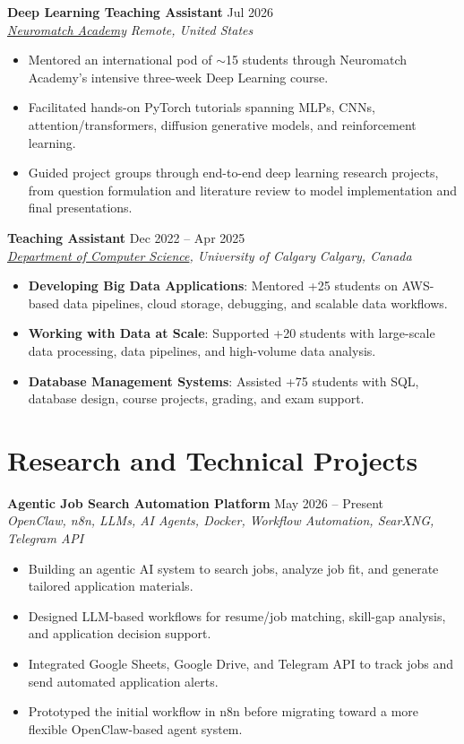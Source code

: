 \documentclass[a4paper,10pt]{article}
\newcommand{\resumeSubheading}[4]{
    \textbf{#1} \hfill #2 \\
    \textit{#3} \hfill \textit{#4}
}
\begin{document}
\resumeSubheading
{Deep Learning Teaching Assistant}
{Jul 2026}
{\href{https://neuromatch.io/}{Neuromatch Academy}}
{Remote, United States}
\begin{itemize}[leftmargin=0.25in]
    \item Mentored an international pod of $\sim$15 students through Neuromatch Academy's intensive three-week Deep Learning course.
    \item Facilitated hands-on PyTorch tutorials spanning MLPs, CNNs, attention/transformers, diffusion generative models, and reinforcement learning.
    \item Guided project groups through end-to-end deep learning research projects, from question formulation and literature review to model implementation and final presentations.
\end{itemize}

\resumeSubheading
{Teaching Assistant}
{Dec 2022 -- Apr 2025}
{\href{https://science.ucalgary.ca/computer-science} {Department of Computer Science}, University of Calgary}
{Calgary, Canada}
\begin{itemize}[leftmargin=0.25in]
    \item \textbf{Developing Big Data Applications}: Mentored +25 students on AWS-based data pipelines, cloud storage, debugging, and scalable data workflows. 
    \item \textbf{Working with Data at Scale}: Supported +20 students with large-scale data processing, data pipelines, and high-volume data analysis. 
    \item \textbf{Database Management Systems}: Assisted +75 students with SQL, database design, course projects, grading, and exam support.
\end{itemize}


\section*{Research and Technical Projects}

\noindent
\textbf{Agentic Job Search Automation Platform} \hfill May 2026 -- Present \\
\textit{OpenClaw, n8n, LLMs, AI Agents, Docker, Workflow Automation, SearXNG, Telegram API}
\begin{itemize}[leftmargin=0.25in]
    \item Building an agentic AI system to search jobs, analyze job fit, and generate tailored application materials.
    \item Designed LLM-based workflows for resume/job matching, skill-gap analysis, and application decision support.
    \item Integrated Google Sheets, Google Drive, and Telegram API to track jobs and send automated application alerts.
    \item Prototyped the initial workflow in n8n before migrating toward a more flexible OpenClaw-based agent system.
\end{itemize}
\end{document}
